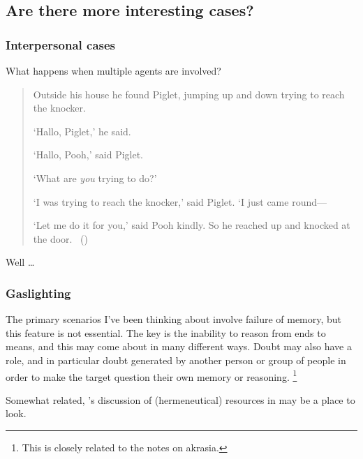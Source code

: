 \documentclass[10pt]{article}
\newcommand{\hozline}[0]{%
  \noindent\hdashrule[0.5ex][c]{\textwidth}{.1pt}{}
}
\newcommand{\hozlinedash}[0]{%
  \noindent\hdashrule[0.5ex][c]{\textwidth}{.1pt}{2.5pt}
}
\begin{document}
\hozline

\subsection*{Are there more interesting cases?}
\label{sec:are-there-more}

\hozlinedash

\subsubsection*{Interpersonal cases}

What happens when multiple agents are involved?

\begin{quote}
  Outside his house he found Piglet, jumping up and down trying to reach the knocker.

  `Hallo, Piglet,' he said.

  `Hallo, Pooh,' said Piglet.

  `What are \emph{you} trying to do?'

  `I was trying to reach the knocker,' said Piglet. `I just came round---

  `Let me do it for you,' said Pooh kindly.
  So he reached up and knocked at the door.\nolinebreak
\mbox{ }\hfill\mbox{(\cite[77--78]{Milne:2009aa})}
\end{quote}

Well \dots

\hozlinedash

\subsubsection*{Gaslighting}
\label{sec:gaslighting}


The primary scenarios I've been thinking about involve failure of memory, but this feature is not essential.
The key is the inability to reason from ends to means, and this may come about in many different ways.
Doubt may also have a role, and in particular doubt generated by another person or group of people in order to make the target question their own memory or reasoning.\nolinebreak
\footnote{This is closely related to the notes on akrasia.}

\hozlinedash

Somewhat related, \citeauthor{Fricker:2007aa}'s discussion of (hermeneutical) resources in  may be a place to look.
\end{document}
